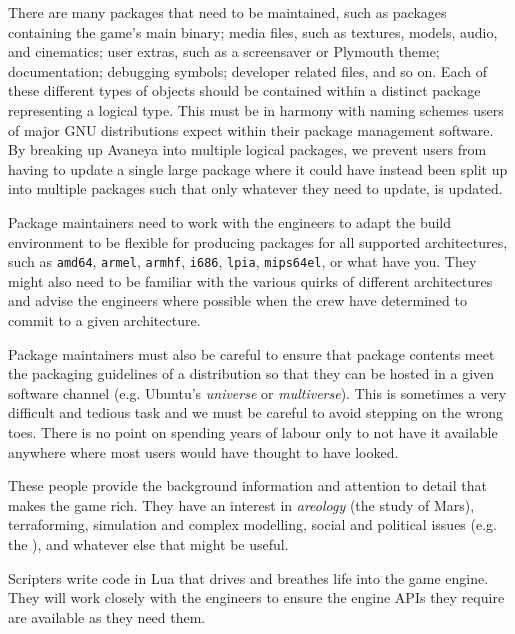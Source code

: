 There are many packages that need to be maintained, such as packages containing the game's main binary; media files, such as textures, models, audio, and cinematics; user extras, such as a screensaver or Plymouth theme; documentation; debugging symbols; developer related files, and so on. Each of these different types of objects should be contained within a distinct package representing a logical type. This must be in harmony with naming schemes users of major GNU distributions expect within their package management software. By breaking up Avaneya into multiple logical packages, we prevent users from having to update a single large package where it could have instead been split up into multiple packages such that only whatever they need to update, is updated.

Package maintainers need to work with the engineers to adapt the build environment to be flexible for producing packages for all supported architectures, such as {\tt amd64}, {\tt armel}, {\tt armhf}, {\tt i686}, {\tt lpia}, {\tt mips64el}, or what have you. They might also need to be familiar with the various quirks of different architectures and advise the engineers where possible when the crew have determined to commit to a given architecture.

Package maintainers must also be careful to ensure that package contents meet the packaging guidelines of a distribution so that they can be hosted in a given software channel (e.g. Ubuntu's {\it universe} or {\it multiverse}). This is sometimes a very difficult and tedious task and we must be careful to avoid stepping on the wrong toes. There is no point on spending years of labour only to not have it available anywhere where most users would have thought to have looked.


These people provide the background information and attention to detail that makes the game rich. They have an interest in {\it areology} (the study of Mars), terraforming, simulation and complex modelling, social and political issues (e.g. the ), and whatever else that might be useful.


Scripters write code in Lua that drives and breathes life into the game engine. They will work closely with the engineers to ensure the engine APIs they require are available as they need them.


